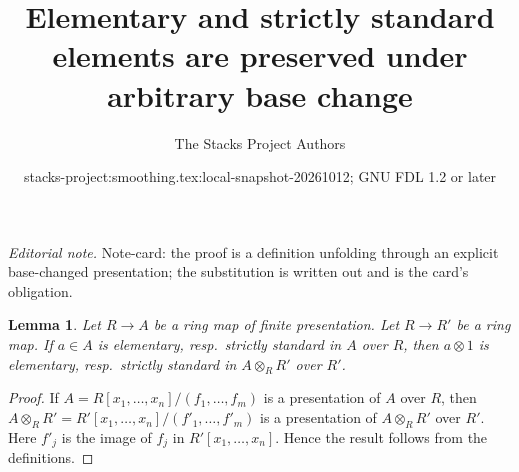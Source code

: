 \documentclass{stacks-project}
\title{Elementary and strictly standard elements are preserved under arbitrary base change}
\author{The Stacks Project Authors}
\date{stacks-project:smoothing.tex:local-snapshot-20261012; GNU FDL 1.2 or later}
\theoremstyle{plain}
\newtheorem{lemma}[subsection]{Lemma}
\theoremstyle{definition}
\theoremstyle{remark}
\numberwithin{equation}{subsection}
\begin{document}
\maketitle
\noindent\textit{Editorial note.} Note-card: the proof is a definition unfolding through an explicit base-changed presentation; the substitution is written out and is the card's obligation.\par\medskip
\begin{lemma}
\label{lemma-strictly-standard-base-change}
Let $R \to A$ be a ring map of finite presentation.
Let $R \to R'$ be a ring map. If $a \in A$ is elementary,
resp.\ strictly standard in $A$ over $R$, then $a \otimes 1$
is elementary, resp.\ strictly standard in $A \otimes_R R'$ over $R'$.
\end{lemma}

\begin{proof}
If $A = R[x_1, \ldots, x_n]/(f_1, \ldots, f_m)$ is a presentation
of $A$ over $R$, then
$A \otimes_R R' = R'[x_1, \ldots, x_n]/(f'_1, \ldots, f'_m)$
is a presentation of $A \otimes_R R'$ over $R'$. Here $f'_j$ is
the image of $f_j$ in $R'[x_1, \ldots, x_n]$.
Hence the result follows from the definitions.
\end{proof}
\end{document}
